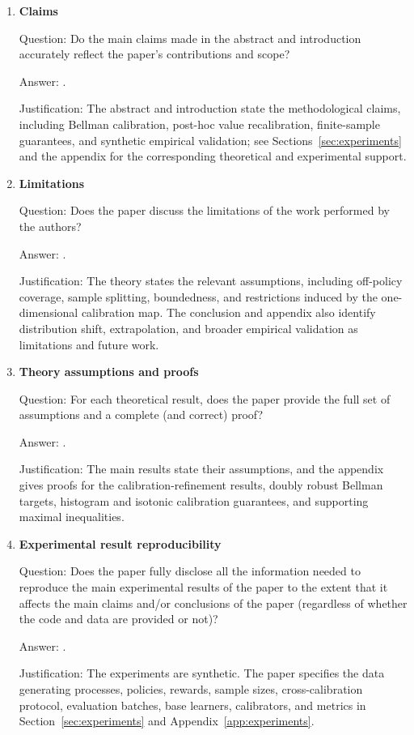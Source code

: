 \documentclass{article}
\theoremstyle{plain}
\theoremstyle{definition}
\theoremstyle{remark}
\begin{document}
\begin{enumerate}[leftmargin=5mm]
\item \textbf{Claims}

Question: Do the main claims made in the abstract and introduction accurately
reflect the paper's contributions and scope?

Answer: \answerYes{}.

Justification: The abstract and introduction state the methodological claims,
including Bellman calibration, post-hoc value recalibration, finite-sample
guarantees, and synthetic empirical validation; see Sections~\ref{sec:experiments}
and the appendix for the corresponding theoretical and experimental support.

\item \textbf{Limitations}

Question: Does the paper discuss the limitations of the work performed by the
authors?

Answer: \answerYes{}.

Justification: The theory states the relevant assumptions, including
off-policy coverage, sample splitting, boundedness, and restrictions induced by
the one-dimensional calibration map. The conclusion and appendix also identify
distribution shift, extrapolation, and broader empirical validation as
limitations and future work.

\item \textbf{Theory assumptions and proofs}

Question: For each theoretical result, does the paper provide the full set of
assumptions and a complete (and correct) proof?

Answer: \answerYes{}.

Justification: The main results state their assumptions, and the appendix gives
proofs for the calibration-refinement results, doubly robust Bellman targets,
histogram and isotonic calibration guarantees, and supporting maximal
inequalities.

\item \textbf{Experimental result reproducibility}

Question: Does the paper fully disclose all the information needed to reproduce
the main experimental results of the paper to the extent that it affects the
main claims and/or conclusions of the paper (regardless of whether the code and
data are provided or not)?

Answer: \answerYes{}.

Justification: The experiments are synthetic. The paper specifies the data
generating processes, policies, rewards, sample sizes, cross-calibration
protocol, evaluation batches, base learners, calibrators, and metrics in
Section~\ref{sec:experiments} and Appendix~\ref{app:experiments}.


\end{enumerate}
\end{document}
